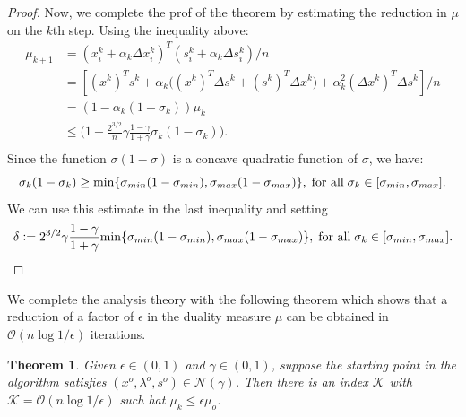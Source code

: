 \documentclass[a4paper,10 pt,titlepage,twoside]{book}
\theoremstyle{plain}
\newtheorem{thm}{Theorem}[chapter]
\theoremstyle{definition}
\theoremstyle{remark}
\begin{document}
\begin{proof}
Now, we complete the prof of the theorem by estimating the reduction in $\mu$ on the $k$th step. Using the inequality above:
\begin{align*}
\mu_{k+1}& = (x_{i}^{k} + \alpha_{k}\Delta x_{i}^{k})^{T}(s_{i}^{k} + \alpha_{k}\Delta s_{i}^{k})/n\\
		 & = [(x^{k})^{T}s^{k} + \alpha_{k}\big((x^{k})^{T}\Delta s^{k} + (s^{k})^{T}\Delta x^{k}\big) +\alpha^{2}_{k}(\Delta x^{k})^{T}\Delta s^{k}]/n\\
		 & = (1 - \alpha_{k}(1-\sigma_{k}))\mu_{k}\\
		 & \leq \Big(1 - \frac{2^{3/2}}{n}\gamma\frac{1-\gamma}{1+\gamma}\sigma_{k}(1-\sigma_{k})\Big).\\
\end{align*}
Since the function $\sigma(1 - \sigma)$ is a concave quadratic function of $\sigma$, we have:
\begin{equation*}
\sigma_{k}(1-\sigma_{k})\geq \text{min}\{\sigma_{min}(1-\sigma_{min}),\sigma_{max}(1-\sigma_{max})\}, \text{\;for all\;}\sigma_{k}\in[\sigma_{min},\sigma_{max}].
\end{equation*}
We can use this estimate in the last inequality and setting
\begin{equation*}
\delta \vcentcolon=2^{3/2}\gamma\frac{1-\gamma}{1+\gamma}\text{min}\{\sigma_{min}(1-\sigma_{min}),\sigma_{max}(1-\sigma_{max})\}, \text{\;for all\;}\sigma_{k}\in[\sigma_{min},\sigma_{max}].
\end{equation*}
\end{proof}
We complete the analysis theory with the following theorem which shows that a reduction of a factor of $\epsilon$ in the duality measure $\mu$ can be obtained in $\mathcal{O}(n\log{1/\epsilon})$ iterations.
\begin{thm}
	Given $\epsilon\in(0,1)$ and $\gamma\in(0,1)$, suppose the starting point in the algorithm satisfies $(x^{o},\lambda^{o},s^{o})\in\mathcal{N}(\gamma)$. Then there is an index $\mathcal{K}$ with $\mathcal{K}=\mathcal{O}(n\log1/\epsilon)$ such hat $\mu_{k}\leq\epsilon\mu_{o}$.
\end{thm}
\end{document}
